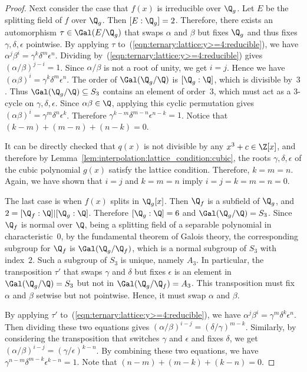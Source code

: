 \documentclass[11pt]{article}
\begin{document}
\begin{proof}
 Next consider the case that $f(x)$ is irreducible over $\Q_g$.
 Let $E$ be the splitting field of $f$ over $\Q_g$.
 Then $[E:\Q_g] = 2$.
 Therefore,
 there exists an automorphism $\tau \in \Gal(E / \Q_g)$ that swaps $\alpha$ and $\beta$ but fixes $\Q_g$ and thus fixes $\gamma,\delta,\epsilon$ pointwise.
 By applying $\tau$ to~(\ref{eqn:ternary:lattice:y>=4:reducible}),
 we have $\alpha^j \beta^i = \gamma^k \delta^m \epsilon^n$.
 Dividing by~(\ref{eqn:ternary:lattice:y>=4:reducible}) gives $(\alpha / \beta)^{j-i} = 1$.
 Since $\alpha / \beta$ is not a root of unity,
 we get $i=j$.
 Hence we have $(\alpha \beta)^i = \gamma^k \delta^m \epsilon^n$.
 The order of $\Gal(\Q_g / \Q)$ is $[\Q_g:\Q]$,
 which is divisible by~$3$.
 Thus $\Gal(\Q_g / \Q) \subseteq S_3$ contains an element of order~$3$,
 which must act as a 3-cycle on $\gamma,\delta,\epsilon$.
 Since $\alpha \beta \in \Q$,
 applying this cyclic permutation
 gives $(\alpha \beta)^i = \gamma^m \delta^n \epsilon^k$.
 Therefore $\gamma^{k-m} \delta^{m-n} \epsilon^{n-k} = 1$.
 Notice that $(k-m) + (m-n) + (n-k) = 0$.

 It can be directly checked that $q(x)$ is not divisible by any $x^3 + c \in \Z[x]$,
 and therefore by Lemma~\ref{lem:interpolation:lattice_condition:cubic},
 the roots $\gamma, \delta, \epsilon$ of the cubic polynomial $g(x)$ satisfy the lattice condition.
 Therefore, $k=m=n$.
 Again, we have shown that $i=j$ and $k=m=n$ imply $i=j=k=m=n=0$. 

 The last case is when $f(x)$ splits in $\Q_g[x]$.
 Then $\Q_f$ is a subfield of $\Q_g$, and $2 = [\Q_f: \Q] | [\Q_g: \Q]$.
 Therefore $[\Q_g:\Q] = 6$ and $\Gal(\Q_g / \Q) = S_3$.
 Since $\Q_f$ is normal over $\Q$,
 being a splitting field of a separable polynomial in characteristic~$0$, 
 by the fundamental theorem of Galois theory,
 the corresponding subgroup for $\Q_f$ is $\Gal(\Q_g / \Q_f)$,
 which is a normal subgroup of $S_3$ with index~$2$.
 Such a subgroup of $S_3$ is unique, namely $A_3$.
 In particular,
 the transposition $\tau'$ that swaps $\gamma$ and $\delta$ but fixes $\epsilon$ is an element in $\Gal(\Q_g / \Q) = S_3$ but not in $\Gal(\Q_g / \Q_f) = A_3$.
 This transposition must fix $\alpha$ and $\beta$ setwise but not pointwise.
 Hence, it must swap $\alpha$ and $\beta$.

 By applying $\tau'$ to~(\ref{eqn:ternary:lattice:y>=4:reducible}),
 we have $\alpha^j \beta^i = \gamma^m \delta^k \epsilon^n$.
 Then dividing these two equations gives $(\alpha / \beta)^{i-j} = (\delta / \gamma)^{m-k}$.
 Similarly,
 by considering the transposition that switches $\gamma$ and $\epsilon$ and fixes $\delta$,
 we get $(\alpha / \beta)^{i-j} = (\gamma / \epsilon)^{k-n}$.
 By combining these two equations,
 we have $\gamma^{n-m} \delta^{m-k} \epsilon^{k-n} = 1$.
 Note that $(n-m) + (m-k) + (k-n) = 0$.


\end{proof}
\end{document}
